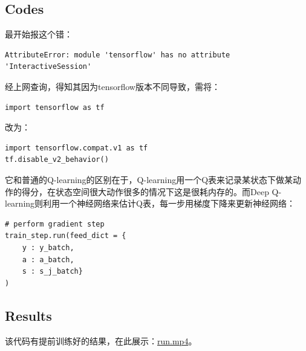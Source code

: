 \documentclass[a4paper, 11pt]{article}
\begin{document}
\subsection{Codes}
最开始报这个错：
\begin{lstlisting}
AttributeError: module 'tensorflow' has no attribute 'InteractiveSession'
\end{lstlisting}
经上网查询，得知其因为tensorflow版本不同导致，需将：
\begin{lstlisting}
import tensorflow as tf
\end{lstlisting}
改为：
\begin{lstlisting}
import tensorflow.compat.v1 as tf
tf.disable_v2_behavior()
\end{lstlisting}
它和普通的Q-learning的区别在于，Q-learning用一个Q表来记录某状态下做某动作的得分，在状态空间很大动作很多的情况下这是很耗内存的。而Deep Q-learning则利用一个神经网络来估计Q表，每一步用梯度下降来更新神经网络：
\begin{lstlisting}
# perform gradient step
train_step.run(feed_dict = {
    y : y_batch,
    a : a_batch,
    s : s_j_batch}
)
\end{lstlisting}
\subsection{Results}
该代码有提前训练好的结果，在此展示：\href{run:run.mp4}{run.mp4}。
\end{document}
